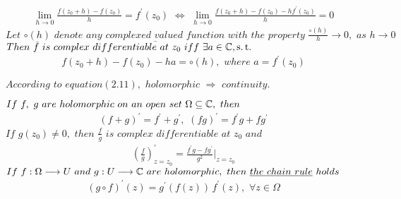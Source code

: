 \vspace*{2em}
\begin{align}
	\lim_{h \to 0}{\frac{f(z_0 + h) - f(z_0)}{h}} = f^{'}(z_0) \,\, \Leftrightarrow \,\, \lim_{h \to 0}{\frac{f(z_0 + h) - f(z_0) - hf^{'}(z_0)}{h}} = 0
\end{align}
$Let \,\, \underline{\textbf{$\circ(h)$}} \,\, denote \,\, \underline{\textbf{$any \,\, complexed \,\, valued \,\, function$}} \,\, with \,\, the \,\, property \,\, \frac{\circ(h)}{h} \to 0 , \,\, as \,\, h \to 0$\\
$Then \,\, f \,\, is \,\, complex \,\, differentiable \,\, at \,\, z_0 \,\, iff \,\, \exists a \in \mathbb{C} , \operatorname{s.t.}$
\begin{align}
	f(z_0 + h) - f(z_0) - ha = \circ(h) , \,\, where \,\, a = f^{'}(z_0)
\end{align}
\begin{rmk}
	$According \,\, to \,\, equation(2.11) , \,\, holomorphic \,\, \Rightarrow \,\, continuity.$
\end{rmk}

\newpage
\begin{proposition}\label{prop 2.2.1}
	$If \,\, f , \,\, g \,\, are \,\, holomorphic \,\, on \,\, an \,\, open \,\, set \,\, \Omega \subseteq \mathbb{C} , \,\, then$
	\begin{align}
		(f + g)^{'} = f^{'} + g^{'} , \,\, (fg)^{'} = f^{'}g + fg^{'}
	\end{align}
	$If \,\, g(z_0) \neq 0 , \,\, then \,\, \frac{f}{g} \,\, is \,\, complex \,\, differentiable \,\, at \,\, z_0 \,\, and$
	\begin{align}
		\left( \frac{f}{g} \right)^{'}_{z = z_0} = \frac{f^{'}g - fg^{'}}{g^2}\Big|_{z = z_0}
	\end{align}
	$If \,\, f : \Omega \longrightarrow U \,\, and \,\, g : U \longrightarrow \mathbb{C} \,\, are \,\, holomorphic , \,\, then \,\, \underline{\textbf{$the \,\, chain \,\, rule$}} \,\, holds$
	\begin{align}
		(g \circ f)^{'}(z) = g^{'}(f(z)) \, f^{'}(z) , \,\, \forall z \in \Omega
	\end{align}
\end{proposition}

\newpage
